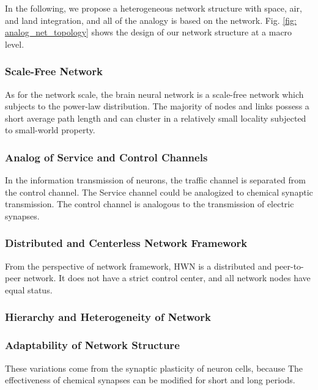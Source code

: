 \documentclass[journal,comsoc]{IEEEtran}
\begin{document}
	In the following, we propose a heterogeneous network structure with space, air, and land integration, and all of the analogy is based on the network.
	Fig. \ref{fig: analog_net_topology} shows the design of our network structure at a macro level.
	\subsubsection{Scale-Free Network}
	As for the network scale, the brain neural network is a scale-free network which subjects to the power-law distribution. 
	The majority of nodes and links possess a short average path length and can cluster in a relatively small locality subjected to small-world property.
	
	\subsubsection{Analog of Service and Control Channels}
	In the information transmission of neurons, the traffic channel is separated from the control channel.
	The Service channel could be analogized to chemical synaptic transmission. 			
	The control channel is analogous to the transmission of electric synapses. 
	
	\subsubsection{Distributed and Centerless Network Framework}
	From the perspective of network framework, HWN is a distributed and peer-to-peer network. 
	It does not have a strict control center, and all network nodes have equal status.
	
	
	\subsubsection{Hierarchy and Heterogeneity of Network}
	
	\subsubsection{Adaptability of Network Structure}
	These variations come from the synaptic plasticity of neuron cells, because The effectiveness of chemical synapses can be modified for short and long periods\cite{kandel2000principles}.
	
\end{document}
